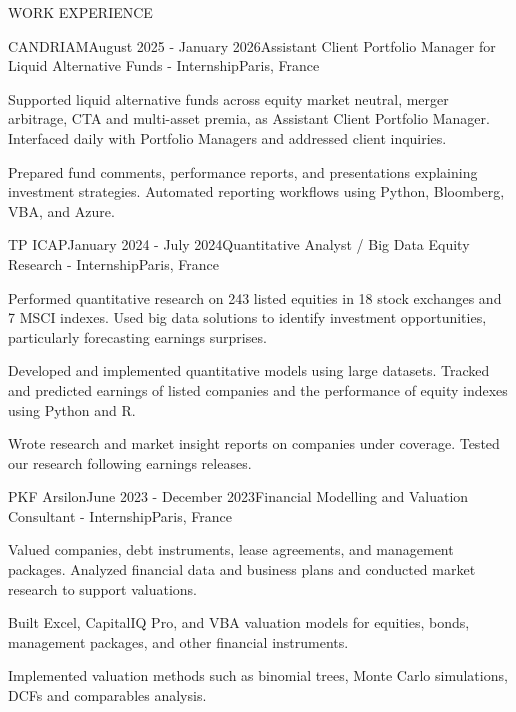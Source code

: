 \documentclass{resume} %
\begin{document}
\begin{rSection}{WORK EXPERIENCE}

    \begin{rSubsection}{CANDRIAM}{August 2025 - January 2026}{Assistant Client Portfolio Manager for Liquid Alternative Funds - Internship}{Paris, France}
        \item Supported liquid alternative funds across equity market neutral, merger arbitrage, CTA and multi-asset premia, as Assistant Client Portfolio Manager. Interfaced daily with Portfolio Managers and addressed client inquiries.
        \item Prepared fund comments, performance reports, and presentations explaining investment strategies. Automated reporting workflows using Python, Bloomberg, VBA, and Azure.
    \end{rSubsection}

    \begin{rSubsection}{TP ICAP}{January 2024 - July 2024}{Quantitative Analyst / Big Data Equity Research - Internship}{Paris, France}
        \item Performed quantitative research on 243 listed equities in 18 stock exchanges and 7 MSCI indexes. Used big data solutions to identify investment opportunities, particularly forecasting earnings surprises.
        \item Developed and implemented quantitative models using large datasets. Tracked and predicted earnings of listed companies and the performance of equity indexes using Python and R.
        \item Wrote research and market insight reports on companies under coverage. Tested our research following earnings releases. 
    \end{rSubsection}

    \begin{rSubsection}{PKF Arsilon}{June 2023 - December 2023}{Financial Modelling and Valuation Consultant - Internship}{Paris, France}
        \item Valued companies, debt instruments, lease agreements, and management packages. Analyzed financial data and business plans and conducted market research to support valuations.
        \item Built Excel, CapitalIQ Pro, and VBA valuation models for equities, bonds, management packages, and other financial instruments. 
        \item Implemented valuation methods such as binomial trees, Monte Carlo simulations, DCFs and comparables analysis.
    \end{rSubsection}


\end{rSection}
\end{document}
